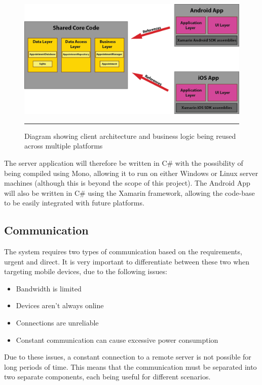 \begin{figure}[htbp]
	\centering
		\includegraphics[width=\textwidth,height=\textheight,keepaspectratio]{Figures/AppOverview.png}
		\rule{35em}{0.5pt}
		\caption[Diagram showing client architecture and business logic being reused across multiple platforms]{Diagram showing client architecture and business logic being reused across multiple platforms}
	\label{fig:appoverview}
\end{figure}

The server application will therefore be written in C\# with the possibility of being compiled using Mono, allowing it to run on either Windows or Linux server machines (although this is beyond the scope of this project). The Android App will also be written in C\# using the Xamarin framework, allowing the code-base to be easily integrated with future platforms.

\subsection{Communication}

The system requires two types of communication based on the requirements, urgent and direct. It is very important to differentiate between these two when targeting mobile devices, due to the following issues:
\begin{itemize}
	\item Bandwidth is limited
	\item Devices aren't always online
	\item Connections are unreliable
	\item Constant communication can cause excessive power consumption
\end{itemize}

Due to these issues, a constant connection to a remote server is not possible for long periods of time. This means that the communication must be separated into two separate components, each being useful for different scenarios.

